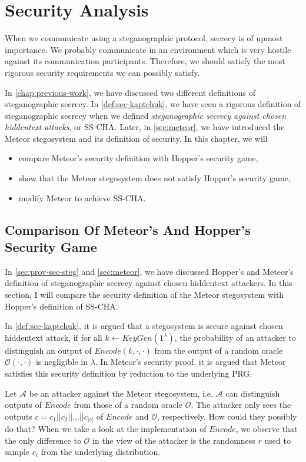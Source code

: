 \chapter{Security Analysis}
\label{chap:security}

When we communicate using a steganographic protocol, secrecy is of upmost importance.
We probably communicate in an environment which is very hostile against its communication participants.
Therefore, we should satisfy the most rigorous security requirements we can possibly satisfy.

In \autoref{chap:previous-work}, we have discussed two different definitions of steganographic secrecy.
In \autoref{def:sec-kaptchuk}, we have seen a rigorous definition of steganographic secrecy when we defined \emph{steganographic secrecy against chosen hiddentext attacks}, or SS-CHA.
Later, in \autoref{sec:meteor}, we have introduced the Meteor stegosystem and its definition of security.
In this chapter, we will
\begin{itemize}
	\item compare Meteor's security definition with Hopper's security game,
	\item show that the Meteor stegosystem does not satisfy Hopper's security game,
	\item modify Meteor to achieve SS-CHA.
\end{itemize}

\section{Comparison Of Meteor's And Hopper's Security Game}

In \autoref{sec:prov-sec-steg} and \autoref{sec:meteor}, we have discussed Hopper's and Meteor's definition of steganographic secrecy against chosen hiddentext attackers. In this section, I will compare the security definition of the Meteor stegosystem with Hopper's definition of SS-CHA.

In \autoref{def:sec-kaptchuk}, it is argued that a stegosystem is secure against chosen hiddentext attack, if for all $k \leftarrow KeyGen(1^\lambda)$, the probability of an attacker to distinguish an output of $Encode(k, \cdot, \cdot)$ from the output of a random oracle $\mathcal{O}(\cdot, \cdot)$ is negligible in $\lambda$. In Meteor's security proof, it is argued that Meteor satisfies this security definition by reduction to the underlying PRG.

Let $\mathcal{A}$ be an attacker against the Meteor stegosystem, i.e. $\mathcal{A}$ can distinguish outputs of $Encode$ from those of a random oracle $\mathcal{O}$.
The attacker only sees the outputs $c = c_1 ||c_2 || \dots || c_{|c|}$ of $Encode$ and $\mathcal{O}$, respectively. 
How could they possibly do that?
When we take a look at the implementation of $Encode$, we observe that the only difference to $\mathcal{O}$ in the view of the attacker is the randomness $r$ used to sample $c_i$ from the underlying distribution.

